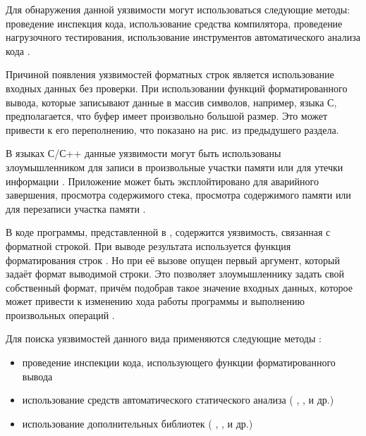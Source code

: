 %
Для обнаружения данной уязвимости могут использоваться следующие методы: проведение инспекция кода, 
использование средства компилятора, проведение нагрузочного тестирования, использование 
инструментов автоматического анализа кода   
.



%
Причиной появления уязвимостей форматных строк является использование входных данных без проверки. 
%
При использовании функций форматированного вывода, которые записывают данные в массив символов, 
например,  языка С, предполагается, что буфер имеет произвольно большой 
размер. 
%
Это может привести к его переполнению, что показано на рис. из предыдушего раздела.

%
В языках С/С++ данные уязвимости могут быть использованы злоумышленником для записи в произвольные 
участки памяти или для утечки информации . 
%
Приложение может быть эксплойтировано для аварийного завершения, просмотра содержимого стека, 
просмотра содержимого памяти или для перезаписи участка памяти  
 . 

%
В коде программы, представленной в 
, содержится уязвимость, 
связанная с форматной строкой.
%
При выводе результата используется функция форматирования строк . 
%
Но при её вызове опущен первый аргумент, который задаёт формат выводимой строки. 
%
Это позволяет злоумышленнику задать свой собственный формат, причём подобрав такое значение входных 
данных, которое может привести к изменению хода работы программы и выполнению произвольных операций 
. 

%
Для поиска уязвимостей данного вида применяются следующие методы  
: 
\begin{itemize}
	\item проведение инспекции кода, использующего функции форматированного вывода 
	\item использование средств автоматического статического анализа ( , 
		 ,   и др.) 
	\item использование дополнительных библиотек ( , 
		 ,   и др.) 
\end{itemize}

